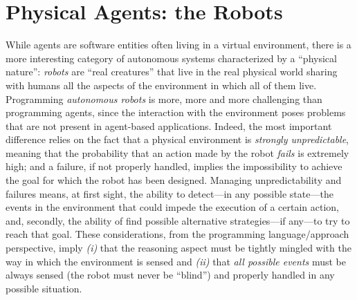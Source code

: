 \section{Physical Agents: the Robots}
While agents are software entities often living in a virtual environment,
there is a more interesting category of autonomous systems characterized by
a ``physical nature'': \emph{robots} are ``real creatures'' that live in
the real physical world sharing with humans all the aspects of the
environment in which all of them live.
Programming \emph{autonomous robots} is more, more and more challenging
than programming agents, since the interaction with the environment poses
problems that are not present in agent-based applications.
Indeed, the most important difference relies on the fact that a physical
environment is \emph{strongly unpredictable}, meaning that the probability
that an action made by the robot \emph{fails} is extremely high; and a
failure, if not properly handled, implies the impossibility to achieve the
goal for which the robot has been designed.
Managing
unpredictability and failures means, at first sight, the ability to
detect---in any possible state---the events in the environment that could
impede the execution of a certain action, and, secondly, the ability of
find possible alternative strategies---if any---to try to reach that goal.
These considerations, from the programming language/approach perspective, imply
\emph{(i)} that the reasoning aspect must be tightly mingled with the way in which
the environment is sensed and \emph{(ii)} that \emph{all possible events} must be
always sensed (the robot must never be ``blind'') and properly handled in
any possible situation.


